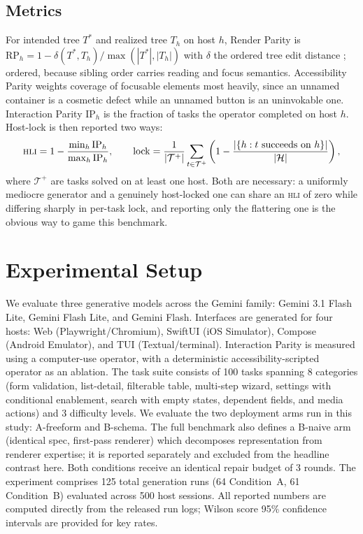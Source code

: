 \documentclass{article}
\newcommand{\hli}{\textsc{hli}}
\begin{document}
\subsection{Metrics}
For intended tree $T^{*}$ and realized tree $T_h$ on host $h$, Render Parity is
$\mathrm{RP}_h = 1 - \delta(T^{*}, T_h) / \max(|T^{*}|, |T_h|)$ with $\delta$ the
ordered tree edit distance \cite{zhangshasha1989}; ordered, because sibling order
carries reading and focus semantics. Accessibility Parity weights coverage of
focusable elements most heavily, since an unnamed container is a cosmetic defect
while an unnamed button is an uninvokable one. Interaction Parity $\mathrm{IP}_h$
is the fraction of tasks the operator completed on host $h$. Host-lock is then
reported two ways:
\begin{equation}
\hli = 1 - \frac{\min_h \mathrm{IP}_h}{\max_h \mathrm{IP}_h},
\qquad
\mathrm{lock} = \frac{1}{|\mathcal{T}^{+}|}\sum_{t \in \mathcal{T}^{+}}
  \left(1 - \frac{|\{h : t \text{ succeeds on } h\}|}{|\mathcal{H}|}\right),
\end{equation}
where $\mathcal{T}^{+}$ are tasks solved on at least one host. Both are necessary:
a uniformly mediocre generator and a genuinely host-locked one can share an \hli{}
of zero while differing sharply in per-task lock, and reporting only the
flattering one is the obvious way to game this benchmark.

\section{Experimental Setup}
We evaluate three generative models across the Gemini family: Gemini 3.1 Flash Lite, Gemini Flash Lite, and Gemini Flash. Interfaces are generated for four hosts: Web (Playwright/Chromium), SwiftUI (iOS Simulator), Compose (Android Emulator), and TUI (Textual/terminal). Interaction Parity is measured using a computer-use operator, with a deterministic accessibility-scripted operator as an ablation. The task suite consists of 100 tasks spanning 8 categories (form validation, list-detail, filterable table, multi-step wizard, settings with conditional enablement, search with empty states, dependent fields, and media actions) and 3 difficulty levels. We evaluate the two deployment arms run in this study: A-freeform and
B-schema. The full benchmark also defines a B-naive arm (identical spec,
first-pass renderer) which decomposes representation from renderer expertise;
it is reported separately and excluded from the headline contrast here. Both conditions receive an identical repair budget of 3 rounds. The experiment comprises 125 total generation runs (64 Condition~A, 61 Condition~B) evaluated across 500 host sessions. All reported numbers are computed directly from the released run logs; Wilson score 95\% confidence intervals are provided for key rates.
\end{document}

